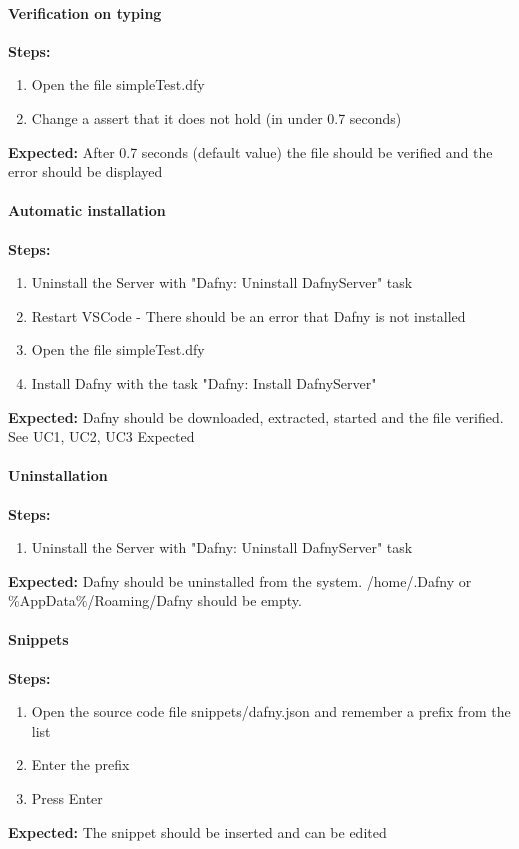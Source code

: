 \paragraph{Verification on typing}
\textbf{\newline Steps:}
\begin{enumerate}
	\item Open the file simpleTest.dfy
	\item Change a assert that it does not hold (in under 0.7 seconds)
\end{enumerate}
\textbf{\newline Expected:}
After 0.7 seconds (default value) the file should be verified and the error should be displayed 

\paragraph{Automatic installation}
\textbf{\newline Steps:}
\begin{enumerate}
\item Uninstall the Server with "Dafny: Uninstall DafnyServer" task
\item Restart VSCode - There should be an error that Dafny is not installed
\item Open the file simpleTest.dfy
\item Install Dafny with the task "Dafny: Install DafnyServer" 
\end{enumerate}
\textbf{\newline Expected:}
Dafny should be downloaded, extracted, started and the file verified. See UC1, UC2, UC3 Expected


\paragraph{Uninstallation}
\textbf{\newline Steps:}
\begin{enumerate}
	\item Uninstall the Server with "Dafny: Uninstall DafnyServer" task
\end{enumerate}
\textbf{\newline Expected:}
Dafny should be uninstalled from the system. /home/.Dafny or \%AppData\%/Roaming/Dafny should be empty.


\paragraph{Snippets}
\textbf{\newline Steps:}
\begin{enumerate}
	\item Open the source code file snippets/dafny.json and remember a prefix from the list
	\item Enter the prefix 
	\item Press Enter
\end{enumerate}
\textbf{\newline Expected:}
The snippet should be inserted and can be edited


